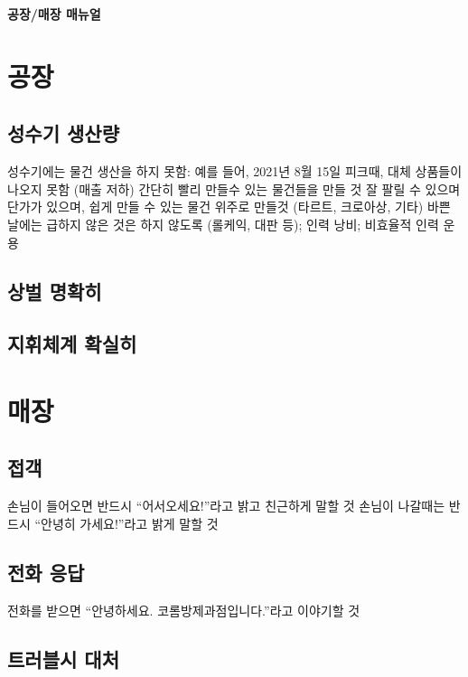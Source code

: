 \documentclass{myproc}
\begin{document}
\begin{center}
  \textcolor{blue2}{\large\bf 공장/매장 매뉴얼}
  \\
  \vspace*{0.8cm}

\end{center}

\small

\section{공장}
\subsection{성수기 생산량}
\bit
\w 성수기에는 물건 생산을 하지 못함: 예를 들어, 2021년 8월 15일 피크때, 대체
상품들이 나오지 못함 (매출 저하)
\w 간단히 빨리 만들수 있는 물건들을 만들 것
\w 잘 팔릴 수 있으며 단가가 있으며, 쉽게 만들 수 있는  물건 위주로 만들것
(타르트, 크로아상, 기타)
\w 바쁜 날에는 급하지 않은 것은 하지 않도록 (롤케익, 대판 등); 인력 낭비;
비효율적 인력 운용
\w 
\eit

\subsection{상벌 명확히}
\bit
\w 
\eit

\subsection{지휘체계 확실히}

\section{매장}
\subsection{접객}
\bit
\w 손님이 들어오면 반드시 ``어서오세요!''라고 밝고 친근하게 말할 것
\w 손님이 나갈때는 반드시 ``안녕히 가세요!''라고 밝게 말할 것
\eit

\subsection{전화 응답}
\bit
\w 전화를 받으면 ``안녕하세요. 코롬방제과점입니다.''라고 이야기할 것
\eit

\subsection{트러블시 대처}
\end{document}
